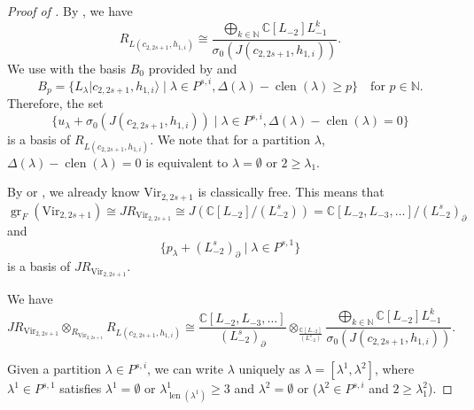 \documentclass[a4paper, 12pt, reqno]{amsart}
\theoremstyle{remark}
\DeclareMathOperator{\len}{len}
\DeclareMathOperator{\clen}{clen}
\DeclareMathOperator{\gr}{gr}
\newcommand{\Vir}{{\mathrm{Vir}}}
\begin{document}
\begin{proof}[Proof of ]
  By , we have
  \begin{equation*}
    R_{L(c_{2, 2s + 1}, h_{1, i})} \cong \frac{\bigoplus_{k \in \mathbb{N}}\mathbb{C}[L_{-2}]L_{-1}^k}{\sigma_0(J(c_{2, 2s + 1}, h_{1, i}))}.
  \end{equation*}
  We use  with the basis $B_0$ provided by  and
  \begin{equation*}
    B_p = \{L_{\lambda}|c_{2, 2s + 1}, h_{1, i}\rangle \mid \lambda \in P^{s, i}, \Delta(\lambda) - \clen(\lambda) \ge p\} \quad \text{for $p \in \mathbb{N}$}.
  \end{equation*}
  Therefore, the set
  \begin{equation}
    \label{eq:9}
    \{u_{\lambda} + \sigma_0(J(c_{2, 2s + 1}, h_{1, i})) \mid \lambda \in P^{s, i}, \Delta(\lambda) - \clen(\lambda) = 0\}
  \end{equation}
  is a basis of $R_{L(c_{2, 2s + 1}, h_{1, i})}$.
  We note that for a partition $\lambda$, $\Delta(\lambda) - \clen(\lambda) = 0$ is equivalent to $\lambda = \emptyset$ or $2 \ge \lambda_1$.

  By \cite{van_ekeren_chiral_2021} or \cite{bruschek_arc_2013}, we already know $\Vir_{2, 2s + 1}$ is classically free.
  This means that $\gr_F(\Vir_{2, 2s + 1}) \cong JR_{\Vir_{2, 2s + 1}} \cong J(\mathbb{C}[L_{-2}]/(L_{-2}^s)) = \mathbb{C}[L_{-2}, L_{-3}, \dots]/(L_{-2}^s)_\partial$ and
  \begin{equation}
    \label{eq:10}
    \{p_\lambda + (L_{-2}^s)_\partial \mid \lambda \in P^{s, 1}\}
  \end{equation}
  is a basis of $JR_{\Vir_{2, 2s + 1}}$.

  We have
  \begin{equation}
    \label{eq:11}
    JR_{\Vir_{2, 2s + 1}} \otimes_{R_{\Vir_{2, 2s + 1}}} R_{L(c_{2, 2s + 1}, h_{1, i})} \cong \frac{\mathbb{C}[L_{-2}, L_{-3}, \dots]}{(L_{-2}^s)_\partial} \otimes_{\frac{\mathbb{C}[L_{-2}]}{(L_{-2}^s)}}\frac{\bigoplus_{k \in \mathbb{N}}\mathbb{C}[L_{-2}]L_{-1}^k}{\sigma_0(J(c_{2, 2s + 1}, h_{1, i}))}.
  \end{equation}

  Given a partition $\lambda \in P^{s, i}$, we can write $\lambda$ uniquely as $\lambda = [\lambda^1, \lambda^2]$, where $\lambda^1 \in P^{s, 1}$ satisfies $\lambda^1 = \emptyset$ or $\lambda^1_{\len(\lambda^1)} \ge 3$ and $\lambda^2 = \emptyset$ or ($\lambda^2 \in P^{s, i}$ and $2 \ge \lambda^2_1$).


\end{proof}
\end{document}
